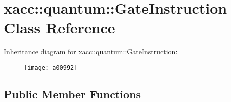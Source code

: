 \hypertarget{a00992}{}\section{xacc\+:\+:quantum\+:\+:Gate\+Instruction Class Reference}
\label{a00992}
Inheritance diagram for xacc\+:\+:quantum\+:\+:Gate\+Instruction\+:\begin{figure}[H]
\begin{center}
\leavevmode
\texttt{[image: a00992]}
\end{center}
\end{figure}
\subsection*{Public Member Functions}
